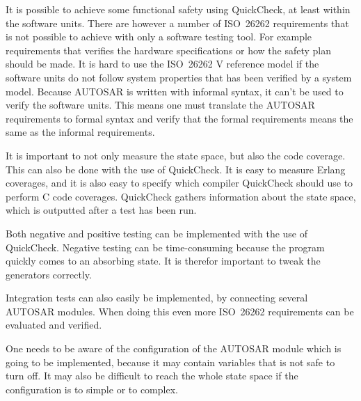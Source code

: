 It is possible to achieve some functional safety using QuickCheck, at
least within the software units. There are however a number of
ISO~26262 requirements that is not possible to achieve with only a
software testing tool. For example requirements that verifies the
hardware specifications or how the safety plan should be made. It is
hard to use the ISO~26262 V reference model if the software units do
not follow system properties that has been verified by a system
model. Because AUTOSAR is written with informal syntax, it can't be
used to verify the software units. This means one must translate the
AUTOSAR requirements to formal syntax and verify that the formal
requirements means the same as the informal requirements.

It is important to not only measure the state space, but also the code
coverage. This can also be done with the use of QuickCheck. It is easy
to measure Erlang coverages, and it is also easy to specify which
compiler QuickCheck should use to perform C code coverages.
QuickCheck gathers information about the state space, which is
outputted after a test has been run.

Both negative and positive testing can be implemented with the use of
QuickCheck. Negative testing can be time-consuming because the program
quickly comes to an absorbing state. It is therefor important to tweak
the generators correctly.

Integration tests can also easily be implemented, by connecting
several AUTOSAR modules. When doing this even more ISO~26262
requirements can be evaluated and verified.

One needs to be aware of the configuration of the AUTOSAR module which
is going to be implemented, because it may contain variables that is
not safe to turn off. It may also be difficult to reach the whole
state space if the configuration is to simple or to complex.
